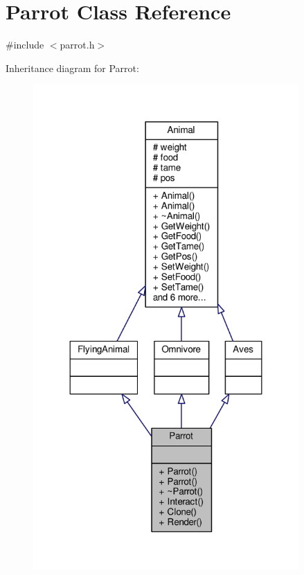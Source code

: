 \hypertarget{classParrot}{}\section{Parrot Class Reference}
\label{classParrot}


{\ttfamily \#include $<$parrot.\+h$>$}



Inheritance diagram for Parrot\+:
\nopagebreak
\begin{figure}[H]
\begin{center}
\leavevmode
\includegraphics[width=287pt]{classParrot__inherit__graph}
\end{center}
\end{figure}


